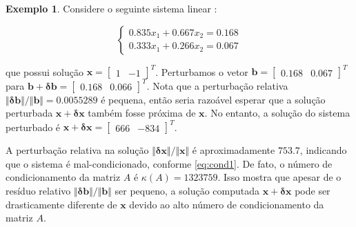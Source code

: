 \documentclass{article}
\theoremstyle{plain}
\theoremstyle{definition}
\newtheorem{exmp}[defn]{Exemplo}
\theoremstyle{remark}
\begin{document}
\begin{exmp}
  Considere o seguinte sistema linear \cite{meyer}:

\[\begin{cases}
  0.835x_1 + 0.667x_2 = 0.168 \\
  0.333x_1 + 0.266x_2 = 0.067
\end{cases}\]

\noindent que possui solução \(\mathbf{x} = \begin{bmatrix} 1 & -1 \end{bmatrix}^T\). Perturbamos o vetor \(\mathbf{b} = \begin{bmatrix} 0.168 & 0.067 \end{bmatrix}^T\) para \(\mathbf{b + \delta b}=\begin{bmatrix} 0.168 & 0.066 \end{bmatrix}^T\). Nota que a perturbação relativa \(\Vert \mathbf{\delta b} \Vert / \Vert \mathbf{b} \Vert = 0.0055289\) é pequena, então seria razoável esperar que a solução perturbada \( \mathbf{x + \delta x} \) também fosse próxima de \(\mathbf{x}\). No entanto, a solução do sistema perturbado é \( \mathbf{x + \delta x} =\begin{bmatrix} 666 & -834 \end{bmatrix}^T\).

A perturbação relativa na solução \(\Vert \mathbf{\delta x} \Vert / \Vert \mathbf{x}  \Vert\) é aproximadamente \(753.7\), indicando que o sistema é mal-condicionado, conforme \eqref{eq:cond1}. De fato, o número de condicionamento da matriz \(A\) é \(\kappa(A)=1323759\). Isso mostra que apesar de o resíduo relativo \(\Vert \mathbf{\delta b} \Vert / \Vert \mathbf{b} \Vert\) ser pequeno, a solução computada \( \mathbf{x + \delta x} \) pode ser drasticamente diferente de \(\mathbf{x}\) devido ao alto número de condicionamento da matriz \(A\).
\end{exmp}
\end{document}
